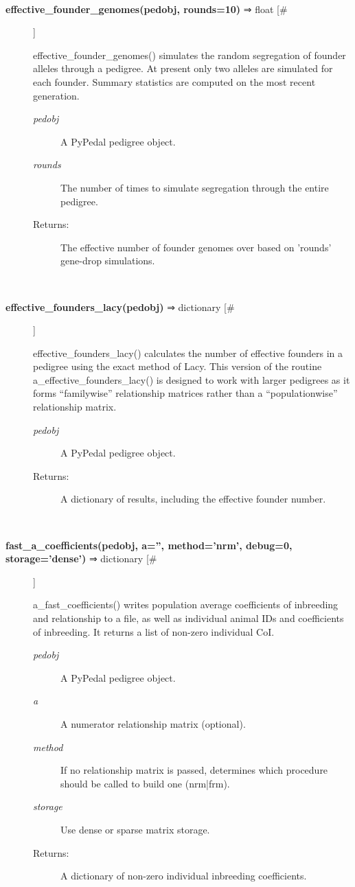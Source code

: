 \begin{description}
\begin{description}
\end{description}
\\ 

\item[\textbf{effective\_founder\_genomes(pedobj, rounds=10)}
 ⇒ float [\#]]

 effective\_founder\_genomes() simulates the random segregation of founder alleles through a pedigree. At present only two alleles are simulated for each founder. Summary statistics are computed on the most recent generation.
\begin{description}
\item[\emph{pedobj}
] A PyPedal pedigree object.
\item[\emph{rounds}
] The number of times to simulate segregation through the entire pedigree.
\item[Returns:] The effective number of founder genomes over based on 'rounds' gene-drop simulations.

\end{description}
\\ 

\item[\textbf{effective\_founders\_lacy(pedobj)}
 ⇒ dictionary [\#]]

 effective\_founders\_lacy() calculates the number of effective founders in a pedigree using the exact method of Lacy. This version of the routine a\_effective\_founders\_lacy() is designed to work with larger pedigrees as it forms ``familywise'' relationship matrices rather than a ``populationwise'' relationship matrix.
\begin{description}
\item[\emph{pedobj}
] A PyPedal pedigree object.
\item[Returns:] A dictionary of results, including the effective founder number.

\end{description}
\\ 

\item[\textbf{fast\_a\_coefficients(pedobj, a='', method='nrm', debug=0, storage='dense')}
 ⇒ dictionary [\#]]

 a\_fast\_coefficients() writes population average coefficients of inbreeding and relationship to a file, as well as individual animal IDs and coefficients of inbreeding. It returns a list of non-zero individual CoI.
\begin{description}
\item[\emph{pedobj}
] A PyPedal pedigree object.
\item[\emph{a}
] A numerator relationship matrix (optional).
\item[\emph{method}
] If no relationship matrix is passed, determines which procedure should be called to build one (nrm|frm).
\item[\emph{storage}
] Use dense or sparse matrix storage.
\item[Returns:] A dictionary of non-zero individual inbreeding coefficients.


\end{description}
\end{description}
